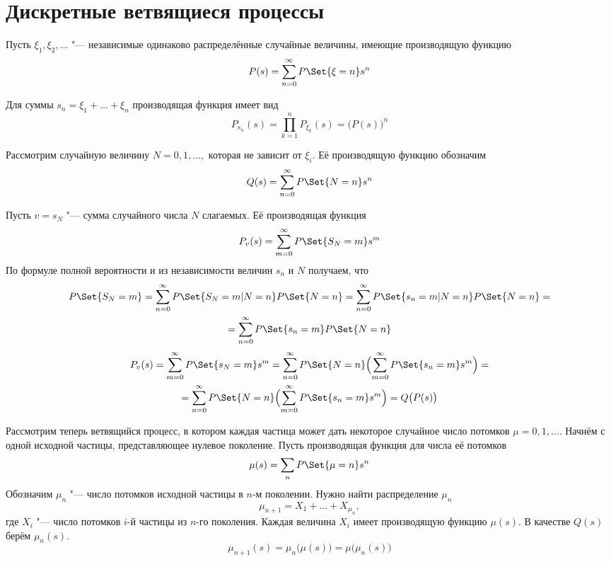 \chapter{Дискретные ветвящиеся процессы}

Пусть $ \xi_1, \xi_2, \dots $ "--- независимые одинаково распределённые случайные величины, имеющие
производящую функцию
$$ P(s) = \sum_{n = 0}^\infty P\Set{\xi = n}s^n $$

Для суммы $ s_n = \xi_1 + \dots + \xi_n $ производящая функция имеет вид
$$ P_{s_n}(s) = \prod_{k = 1}^n P_{\xi_k}(s) = \bigl( P(s) \bigr)^n $$

Рассмотрим случайную величину $ N = 0, 1, \dots, $ которая не зависит от $ \xi_i $.
Её производящую функцию обозначим
$$ Q(s) = \sum_{n = 0}^\infty P\Set{N = n}s^n $$

Пусть $ v = s_N $ "--- сумма случайного числа $ N $ слагаемых.
Её производящая функция
$$ P_v(s) = \sum_{m = 0}^\infty P\Set{S_N = m}s^m $$
По формуле полной вероятности и из независимости величин $ s_n $ и $ N $ получаем, что
\begin{multline*}
    P\Set{S_N = m} = \sum_{n = 0}^\infty P\Set{S_N = m | N = n} P\Set{N = n} =
    \sum_{n = 0}^\infty P\Set{s_n = m | N = n} P\Set{N = n} = \\
    = \sum_{n = 0}^\infty P\Set{s_n = m} P\Set{N = n}
\end{multline*}
\begin{multline*}
    P_v(s) = \sum_{m = 0}^\infty P\Set{s_N = m}s^m =
    \sum_{n = 0}^\infty P\Set{N = n} \Bigl( \sum_{m = 0}^\infty P\Set{s_n = m}s^m \Bigr) = \\
    = \sum_{n = 0}^\infty P\Set{N = n} \Bigl( \sum_{m = 0}^\infty P\Set{s_n = m}s^m \Bigr) =
    Q \bigl( P(s) \bigr)
\end{multline*}

Рассмотрим теперь ветвящийся процесс, в котором каждая частица может дать некоторое случайное число
потомков $ \mu = 0, 1, \dots $.
Начнём с одной исходной частицы, представляющее нулевое поколение.
Пусть производящая функция для числа её потомков
$$ \mu(s) = \sum_n P\Set{\mu = n}s^n $$
Обозначим $ \mu_n $ "--- число потомков исходной частицы в $ n $-м поколении.
Нужно найти распределение $ \mu_n $
$$ \mu_{n + 1} = X_1 + \dots + X_{\mu_n}, $$
где $ X_i $ "--- число потомков $ i $-й частицы из $ n $-го поколения.
Каждая величина $ X_i $ имеет производящую функцию $ \mu(s) $.
В качестве $ Q(s) $ берём $ \mu_n(s) $.
$$ \mu_{n + 1}(s) = \mu_n \bigl( \mu(s) \bigr) = \mu \bigl( \mu_n(s) \bigr) $$

